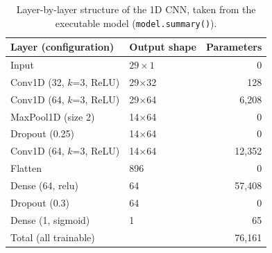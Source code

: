 \begin{table}[t]
\centering
\caption{Layer-by-layer structure of the 1D CNN, taken from the executable model (\texttt{model.summary()}).}
\label{tab:params}
\footnotesize
\begin{tabular}{llr}
\toprule
Layer (configuration) & Output shape & Parameters \\
\midrule
Input & $29\times 1$ & 0 \\
Conv1D (32{,} $k$=3{,} ReLU) & 29$\times$32 & 128 \\
Conv1D (64{,} $k$=3{,} ReLU) & 29$\times$64 & 6{,}208 \\
MaxPool1D (size 2) & 14$\times$64 & 0 \\
Dropout (0.25) & 14$\times$64 & 0 \\
Conv1D (64{,} $k$=3{,} ReLU) & 14$\times$64 & 12{,}352 \\
Flatten & 896 & 0 \\
Dense (64{,} relu) & 64 & 57{,}408 \\
Dropout (0.3) & 64 & 0 \\
Dense (1{,} sigmoid) & 1 & 65 \\
\midrule
Total (all trainable) & & 76{,}161 \\
\bottomrule
\end{tabular}
\end{table}